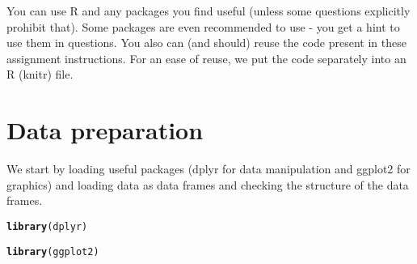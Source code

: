\documentclass{article}\usepackage[]{graphicx}\usepackage[]{color}
\makeatletter
\newcommand{\hlstd}[1]{\textcolor[rgb]{0.345,0.345,0.345}{#1}}%
\newcommand{\hlkwd}[1]{\textcolor[rgb]{0.737,0.353,0.396}{\textbf{#1}}}%
\newenvironment{kframe}{%
 \def\at@end@of@kframe{}%
 \ifinner\ifhmode%
  \def\at@end@of@kframe{\end{minipage}}%
  \begin{minipage}{\columnwidth}%
 \fi\fi%
 \def\FrameCommand##1{\hskip\@totalleftmargin \hskip-\fboxsep
 \colorbox{shadecolor}{##1}\hskip-\fboxsep
     \hskip-\linewidth \hskip-\@totalleftmargin \hskip\columnwidth}%
 \MakeFramed {\advance\hsize-\width
   \@totalleftmargin\z@ \linewidth\hsize
   \@setminipage}}%
 {\par\unskip\endMakeFramed%
 \at@end@of@kframe}
\newenvironment{knitrout}{}{} %
\makeatother
\begin{document}
You can use R and any packages you find useful (unless some questions explicitly prohibit that). Some packages are even recommended to use - you get a hint to use them in questions. You also can (and should) reuse the code present in these assignment instructions. For an ease of reuse, we put the code separately into an R (knitr) file.

\section{Data preparation}

We start by loading useful packages (dplyr for data manipulation and ggplot2 for graphics) and loading data as data frames and checking the structure of the data frames.

\begin{knitrout}
\color{fgcolor}\begin{kframe}
\begin{alltt}
\hlkwd{library}\hlstd{(dplyr)}
\end{alltt}


{\ttfamily\noindent\itshape\color{messagecolor}{\#\# \\\#\# Attaching package: 'dplyr'}}

{\ttfamily\noindent\itshape\color{messagecolor}{\#\# The following objects are masked from 'package:stats':\\\#\# \\\#\#\ \ \ \  filter, lag}}

{\ttfamily\noindent\itshape\color{messagecolor}{\#\# The following objects are masked from 'package:base':\\\#\# \\\#\#\ \ \ \  intersect, setdiff, setequal, union}}\begin{alltt}
\hlkwd{library}\hlstd{(ggplot2)}


\end{alltt}
\end{kframe}
\end{knitrout}
\end{document}
